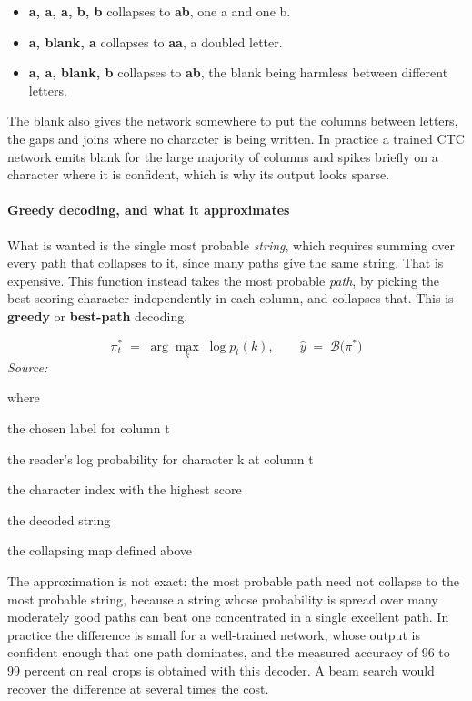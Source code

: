 \begin{itemize}\setlength\itemsep{0pt}
  \item \textbf{a, a, a, b, b} collapses to \textbf{ab}, one a and one b.
  \item \textbf{a, blank, a} collapses to \textbf{aa}, a doubled letter.
  \item \textbf{a, a, blank, b} collapses to \textbf{ab}, the blank being harmless between different letters.
\end{itemize}
The blank also gives the network somewhere to put the columns between letters, the gaps and joins where no character is being written. In practice a trained CTC network emits blank for the large majority of columns and spikes briefly on a character where it is confident, which is why its output looks sparse.


\paragraph{Greedy decoding, and what it approximates}
What is wanted is the single most probable \emph{string}, which requires summing over every path that collapses to it, since many paths give the same string. That is expensive. This function instead takes the most probable \emph{path}, by picking the best-scoring character independently in each column, and collapses that. This is \textbf{greedy} or \textbf{best-path} decoding.


\begin{equation}
\pi^{*}_t \;=\; \arg\max_{k} \; \log p_t(k), \qquad \hat{y} \;=\; \mathcal{B}\big(\pi^{*}\big)
\end{equation}
\noindent\emph{Source: }\cite{graves2006}


\noindent where
\begin{description}[leftmargin=2.4em,style=nextline,font=\normalfont\ttfamily]\setlength\itemsep{1pt}
  \item[{$\pi^{*}_t$}] \normalfont the chosen label for column t
  \item[{$\log p_t(k)$}] \normalfont the reader's log probability for character k at column t
  \item[{$\arg\max_k$}] \normalfont the character index with the highest score
  \item[{$\hat{y}$}] \normalfont the decoded string
  \item[{$\mathcal{B}$}] \normalfont the collapsing map defined above
\end{description}
The approximation is not exact: the most probable path need not collapse to the most probable string, because a string whose probability is spread over many moderately good paths can beat one concentrated in a single excellent path. In practice the difference is small for a well-trained network, whose output is confident enough that one path dominates, and the measured accuracy of 96 to 99 percent on real crops is obtained with this decoder. A beam search would recover the difference at several times the cost.


